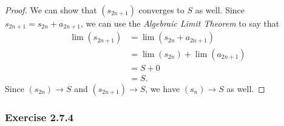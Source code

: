 \begin{enumerate}
\begin{proof}
        We can show that \( (s_{2n+1})\) converges to \( S \) as well. Since \( s_{2n+1} = s_{2n} + a_{2n+1} \), we can use the \textit{Algebraic Limit Theorem} to say that 
        \begin{align*}
            \lim(s_{2n+1})&= \lim(s_{2n} + a_{2n+1}) \\
                          &= \lim(s_{2n}) + \lim (a_{2n+1}) \\
                          &= S + 0 \\
                          &= S.
        \end{align*}
        Since \( (s_{2n}) \to S \) and \( (s_{2n+1}) \to S \), we have \( (s_n) \to S \) as well. 
        \end{proof}
\end{enumerate}

\subsubsection{Exercise 2.7.4}

